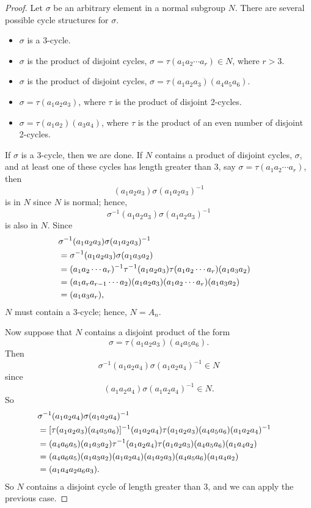  
\begin{proof}
Let $\sigma$ be an arbitrary element in a normal subgroup $N$. There
are several possible cycle structures for $\sigma$.
\begin{itemize}
 
\item
$\sigma$ is a 3-cycle.
 
\item
$\sigma$ is the product of disjoint cycles, $\sigma = \tau(a_1 a_2
\cdots a_r) \in N$, where $r >3$.
 
 
\item
$\sigma$ is the product of disjoint cycles, $\sigma = \tau(a_1 a_2
a_3)(a_4 a_5 a_6)$.
 
 
\item
$\sigma = \tau(a_1 a_2 a_3)$, where $\tau$ is the product of disjoint
2-cycles. 
 
 
\item
$\sigma =
\tau (a_1 a_2) (a_3 a_4) $, where $\tau$ is the product of an even
number of disjoint 2-cycles. 
 
 
\end{itemize}
If $\sigma$ is a $3$-cycle, then we are done. If $N$ contains a
product of disjoint cycles, $\sigma$, and at least one of these cycles
has length greater than 3, say $\sigma = \tau(a_1 a_2 \cdots a_r)$,
then   
\[
(a_1 a_2 a_3)\sigma(a_1 a_2 a_3)^{-1}
\]
is in $N$ since $N$ is normal; hence,
\[
\sigma^{-1}(a_1 a_2 a_3)\sigma(a_1 a_2 a_3)^{-1}
\]
is also in $N$. Since
\begin{align*}
\lefteqn{\sigma^{-1}(a_1 a_2 a_3)\sigma(a_1 a_2 a_3)^{-1} } \\
& = \sigma^{-1}(a_1 a_2 a_3)\sigma(a_1 a_3 a_2) \\
& = (a_1 a_2 \cdots a_r)^{-1}\tau^{-1}(a_1 a_2 a_3) 
      \tau(a_1 a_2 \cdots a_r)(a_1 a_3 a_2) \\
& = (a_1 a_r a_{r-1} \cdots a_2 )(a_1 a_2 a_3) 
      (a_1 a_2 \cdots a_r)(a_1 a_3 a_2) \\
& = (a_1 a_3 a_r),
\end{align*}
$N$ must contain a 3-cycle; hence, $N = A_n$.
 
 
 
 
Now suppose that $N$ contains a disjoint product of the form
\[
\sigma = \tau(a_1 a_2 a_3)(a_4 a_5 a_6).
\]
Then
\[
\sigma^{-1}(a_1 a_2 a_4)\sigma(a_1 a_2 a_4)^{-1} \in N
\]
since
\[
(a_1 a_2 a_4)\sigma(a_1 a_2 a_4)^{-1} \in N.
\]
So
\begin{align*}
\lefteqn{\sigma^{-1}(a_1 a_2 a_4)\sigma(a_1 a_2 a_4)^{-1} } \\
& = [ \tau (a_1 a_2 a_3) (a_4 a_5 a_6) ]^{-1}  (a_1 a_2 a_4) 
      \tau (a_1 a_2 a_3) (a_4 a_5 a_6) (a_1 a_2 a_4)^{-1} \\
& = (a_4 a_6 a_5) (a_1 a_3 a_2) \tau^{-1}(a_1 a_2 a_4)  
      \tau (a_1 a_2 a_3) (a_4 a_5 a_6) (a_1 a_4 a_2) \\
& = (a_4 a_6 a_5)(a_1 a_3 a_2) (a_1 a_2 a_4)
      (a_1 a_2 a_3) (a_4 a_5 a_6)(a_1 a_4 a_2) \\
& = (a_1 a_4 a_2 a_6 a_3).
\end{align*}
So $N$ contains a disjoint cycle of length greater than 3, and we can
apply the previous case. 
 

\end{proof}
